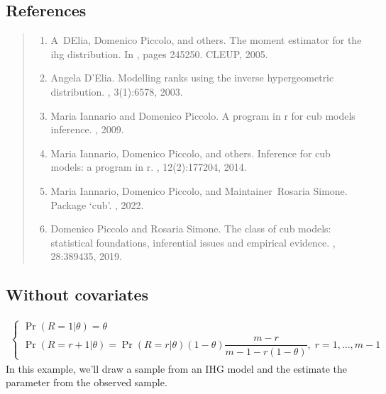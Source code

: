 \documentclass[letterpaper,10pt,english]{sphinxmanual}
\begin{document}
\subsection{References}
\label{\detokenize{manual:id198}}\begin{quote}
\begin{enumerate}
%
\setcounter{enumi}{0}
\item {} 
\sphinxAtStartPar
A D\textquotesingle{}Elia, Domenico Piccolo, and others. The moment estimator for the ihg distribution. In , pages 245\textendash{}250. CLEUP, 2005.

\item {} 
\sphinxAtStartPar
Angela D’Elia. Modelling ranks using the inverse hypergeometric distribution. , 3(1):65\textendash{}78, 2003.

\item {} 
\sphinxAtStartPar
Maria Iannario and Domenico Piccolo. A program in r for cub models inference. , 2009.

\item {} 
\sphinxAtStartPar
Maria Iannario, Domenico Piccolo, and others. Inference for cub models: a program in r. , 12(2):177\textendash{}204, 2014.

\item {} 
\sphinxAtStartPar
Maria Iannario, Domenico Piccolo, and Maintainer Rosaria Simone. Package ‘cub’. , 2022.

\item {} 
\sphinxAtStartPar
Domenico Piccolo and Rosaria Simone. The class of cub models: statistical foundations, inferential issues and empirical evidence. , 28:389\textendash{}435, 2019.

\end{enumerate}
\end{quote}


\subsection{Without covariates}
\label{\detokenize{manual:ihg-without-covariates}}\label{\detokenize{manual:id236}}
\sphinxAtStartPar
{}
\begin{equation*}
\begin{split}\left\{
\begin{array}{l}
    \Pr(R=1|\theta) = \theta
    \\
    \Pr(R=r+1|\theta) = \Pr(R=r|\theta)(1-\theta)\dfrac{m-r}{m-1-r(1-\theta)},\; r= 1, \ldots, m-1
\end{array}
\right.\end{split}
\end{equation*}
\sphinxAtStartPar
In this example, we’ll draw a sample from an IHG model
and the estimate the parameter from the observed sample.
\end{document}
